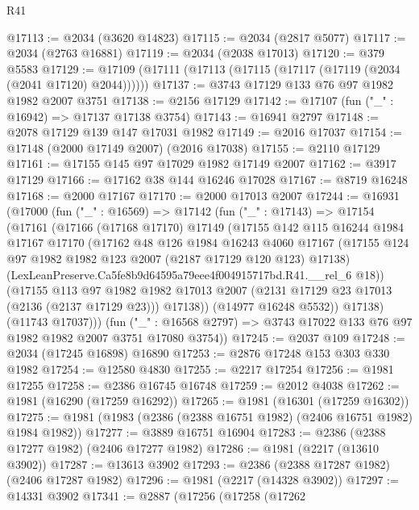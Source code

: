 \begin{lexlean}{R41}
\begin{coremodule}
@17113 := @2034 (@3620 @14823)
@17115 := @2034 (@2817 @5077)
@17117 := @2034 (@2763 @16881)
@17119 := @2034 (@2038 @17013)
@17120 := @379 @5583
@17129 := @17109 (@17111 (@17113 (@17115 (@17117 (@17119 (@2034 (@2041 @17120) @2044))))))
@17137 := @3743 @17129 @133 @76 @97 @1982 @1982 @2007 @3751
@17138 := @2156 @17129
@17142 := @17107 (fun ("_" : @16942) => @17137 @17138 @3754)
@17143 := @16941 @2797
@17148 := @2078 @17129 @139 @147 @17031 @1982
@17149 := @2016 @17037
@17154 := @17148 (@2000 @17149 @2007) (@2016 @17038)
@17155 := @2110 @17129
@17161 := @17155 @145 @97 @17029 @1982 @17149 @2007
@17162 := @3917 @17129
@17166 := @17162 @38 @144 @16246 @17028
@17167 := @8719 @16248
@17168 := @2000 @17167
@17170 := @2000 @17013 @2007
@17244 := @16931
    (@17000
      (fun ("_" : @16569) =>
      @17142
        (fun ("_" : @17143) =>
        @17154
          (@17161
            (@17166
              (@17168 @17170)
              @17149
              (@17155
                @142
                @115
                @16244
                @1984
                @17167
                @17170
                (@17162
                  @48
                  @126
                  @1984
                  @16243
                  @4060
                  @17167
                  (@17155 @124 @97 @1982 @1982 @123 @2007 (@2187 @17129 @120 @123) @17138)
                  (LexLeanPreserve.Ca5fe8b9d64595a79eee4f004915717bd.R41.__rel_6 @18))
                (@17155
                  @113
                  @97
                  @1982
                  @1982
                  @17013
                  @2007
                  (@2131 @17129 @23 @17013 (@2136 (@2137 @17129 @23)))
                  @17138))
              (@14977 @16248 @5532))
            @17138)
          (@11743 @17037)))
      (fun ("_" : @16568 @2797) => @3743 @17022 @133 @76 @97 @1982 @1982 @2007 @3751 @17080 @3754))
@17245 := @2037 @109
@17248 := @2034 (@17245 @16898) @16890
@17253 := @2876 @17248 @153 @303 @330 @1982
@17254 := @12580 @4830
@17255 := @2217 @17254
@17256 := @1981 @17255
@17258 := @2386 @16745 @16748
@17259 := @2012 @4038
@17262 := @1981 (@16290 (@17259 @16292))
@17265 := @1981 (@16301 (@17259 @16302))
@17275 := @1981 (@1983 (@2386 (@2388 @16751 @1982) (@2406 @16751 @1982) @1984 @1982))
@17277 := @3889 @16751 @16904
@17283 := @2386 (@2388 @17277 @1982) (@2406 @17277 @1982)
@17286 := @1981 (@2217 (@13610 @3902))
@17287 := @13613 @3902
@17293 := @2386 (@2388 @17287 @1982) (@2406 @17287 @1982)
@17296 := @1981 (@2217 (@14328 @3902))
@17297 := @14331 @3902
@17341 := @2887
    (@17256
      (@17258
        (@17262

\end{coremodule}
\end{lexlean}
